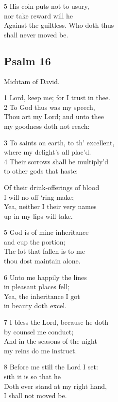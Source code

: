 5 His coin puts not to usury,\\
nor take reward will he\\
Against the guiltless. Who doth thus\\
shall never moved be.

\begin{center}
\quad{}\quad{}
\end{center}

\subsection*{Psalm 16}

Michtam of David.

1 Lord, keep me; for I trust in thee.\\
2 To God thus was my speech,\\
Thou art my Lord; and unto thee\\
my goodness doth not reach:

3 To saints on earth, to th’ excellent,\\
where my delight’s all plac’d.\\
4 Their sorrows shall be multiply’d\\
to other gods that haste:

Of their drink-offerings of blood\\
I will no off ‘ring make;\\
Yea, neither I their very names\\
up in my lips will take.

5 God is of mine inheritance\\
and cup the portion;\\
The lot that fallen is to me\\
thou dost maintain alone.

6 Unto me happily the lines\\
in pleasant places fell;\\
Yea, the inheritance I got\\
in beauty doth excel.

7 I bless the Lord, because he doth\\
by counsel me conduct;\\
And in the seasons of the night\\
my reins do me instruct.

8 Before me still the Lord I set:\\
sith it is so that he\\
Doth ever stand at my right hand,\\
I shall not moved be.

